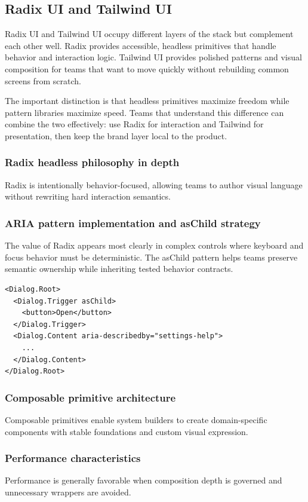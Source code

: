 \documentclass[11pt,twoside,a4paper]{article}
\begin{document}
\subsection{Radix UI and Tailwind UI}
Radix UI and Tailwind UI occupy different layers of the stack but complement each other well. Radix provides accessible, headless primitives that handle behavior and interaction logic. Tailwind UI provides polished patterns and visual composition for teams that want to move quickly without rebuilding common screens from scratch.

The important distinction is that headless primitives maximize freedom while pattern libraries maximize speed. Teams that understand this difference can combine the two effectively: use Radix for interaction and Tailwind for presentation, then keep the brand layer local to the product.

\subsubsection{Radix headless philosophy in depth}
Radix is intentionally behavior-focused, allowing teams to author visual language without rewriting hard interaction semantics.

\subsubsection{ARIA pattern implementation and asChild strategy}
The value of Radix appears most clearly in complex controls where keyboard and focus behavior must be deterministic. The asChild pattern helps teams preserve semantic ownership while inheriting tested behavior contracts.

\begin{verbatim}
<Dialog.Root>
  <Dialog.Trigger asChild>
    <button>Open</button>
  </Dialog.Trigger>
  <Dialog.Content aria-describedby="settings-help">
    ...
  </Dialog.Content>
</Dialog.Root>
\end{verbatim}

\subsubsection{Composable primitive architecture}
Composable primitives enable system builders to create domain-specific components with stable foundations and custom visual expression.

\subsubsection{Performance characteristics}
Performance is generally favorable when composition depth is governed and unnecessary wrappers are avoided.
\end{document}

